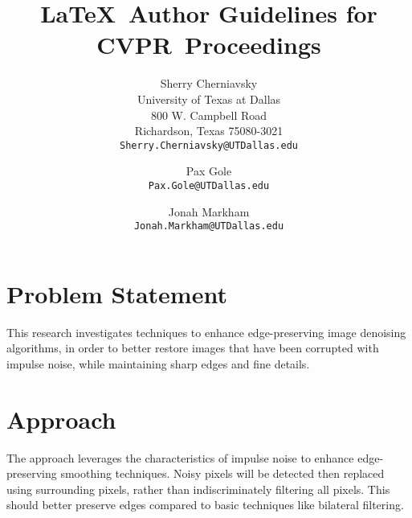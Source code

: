 \documentclass[10pt,twocolumn,letterpaper]{article}
\def\confName{CVPR}
\begin{document}
\title{\LaTeX\ Author Guidelines for \confName~Proceedings}

\author{Sherry Cherniavsky\\
University of Texas at Dallas\\
800 W. Campbell Road\\
Richardson, Texas 75080-3021\\
{\tt\small Sherry.Cherniavsky@UTDallas.edu}
\and
Pax Gole\\
{\tt\small Pax.Gole@UTDallas.edu}
\and
Jonah Markham\\
{\tt\small Jonah.Markham@UTDallas.edu}
}
\maketitle


\section{Problem Statement}
This research investigates techniques to enhance edge-preserving image
denoising algorithms, in order to better restore images that have been
corrupted with impulse noise, while maintaining sharp edges and fine details.

\section{Approach}
The approach leverages the characteristics of impulse noise to enhance
edge-preserving smoothing techniques. Noisy pixels will be detected then
replaced using surrounding pixels, rather than indiscriminately filtering
all pixels. This should better preserve edges compared to basic techniques
like bilateral filtering.
\end{document}
